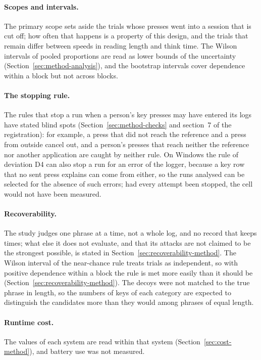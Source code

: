\paragraph{Scopes and intervals.} The primary scope sets aside the trials whose presses went into a session that is cut
off; how often that happens is a property of this design, and the trials that remain differ between speeds in reading
length and think time. The Wilson intervals of pooled proportions are read as lower bounds of the uncertainty
(Section~\ref{sec:method-analysis}), and the bootstrap intervals cover dependence within a block but not across blocks.

\paragraph{The stopping rule.} The rules that stop a run when a person's key presses may have entered its logs have
stated blind spots (Section~\ref{sec:method-checks} and section~7 of the registration): for example, a press that did
not reach the reference and a press from outside cancel out, and a person's presses that reach neither the reference nor
another application are caught by neither rule. On Windows the rule of deviation D4 can also stop a run for an error of
the logger, because a key row that no sent press explains can come from either, so the runs analysed can be selected for
the absence of such errors; had every attempt been stopped, the cell would not have been measured.

\paragraph{Recoverability.} The study judges one phrase at a time, not a whole log, and no record that keeps times;
what else it does not evaluate, and that its attacks are not claimed to be the strongest possible, is stated in
Section~\ref{sec:recoverability-method}. The Wilson interval of the near-chance rule treats trials as independent, so
with positive dependence within a block the rule is met more easily than it should be
(Section~\ref{sec:recoverability-method}).
The decoys were not matched to the true phrase in length, so the numbers of
keys of each category are expected to distinguish the candidates more than they would among phrases of equal length.

\paragraph{Runtime cost.} The values of each system are read within that system (Section~\ref{sec:cost-method}), and
battery use was not measured.

